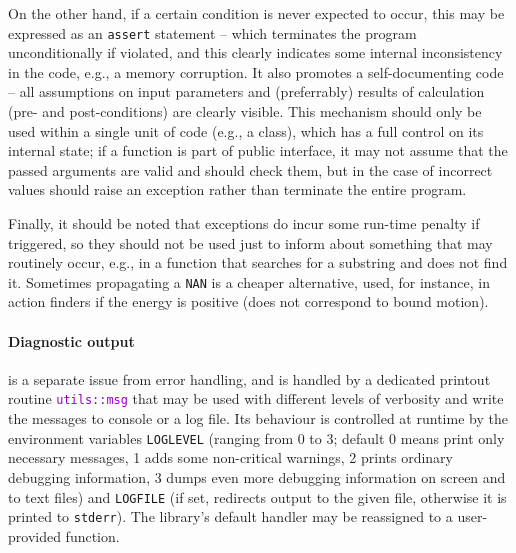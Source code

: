 \documentclass[12pt]{article}
\newcommand{\ttt}[1]{\textcolor{darkviolet}{\texttt{#1}}}
\let\oldparagraph\paragraph
\renewcommand{\paragraph}[1]{\vspace{-2mm}\oldparagraph{#1}}
\begin{document}
On the other hand, if a certain condition is never expected to occur, this may be expressed as an \texttt{assert} statement -- which terminates the program unconditionally if violated, and this clearly indicates some internal inconsistency in the code, e.g., a memory corruption. It also promotes a self-documenting code -- all assumptions on input parameters and (preferrably) results of calculation (pre- and post-conditions) are clearly visible. This mechanism should only be used within a single unit of code (e.g., a class), which has a full control on its internal state; if a function is part of public interface, it may not assume that the passed arguments are valid and should check them, but in the case of incorrect values should raise an exception rather than terminate the entire program.

Finally, it should be noted that exceptions do incur some run-time penalty if triggered, so they should not be used just to inform about something that may routinely occur, e.g., in a function that searches for a substring and does not find it. Sometimes propagating a \texttt{NAN} is a cheaper alternative, used, for instance, in action finders if the energy is positive (does not correspond to bound motion).

\paragraph{Diagnostic output}  is a separate issue from error handling, and is handled by a dedicated printout routine \ttt{utils::msg} that may be used with different levels of verbosity and write the messages to console or a log file. Its behaviour is controlled at runtime by the environment variables \texttt{LOGLEVEL} (ranging from 0 to 3; default 0 means print only necessary messages, 1 adds some non-critical warnings, 2 prints ordinary debugging information, 3 dumps even more debugging information on screen and to text files) and \texttt{LOGFILE} (if set, redirects output to the given file, otherwise it is printed to \texttt{stderr}). The library's default handler may be reassigned to a user-provided function.
\end{document}
